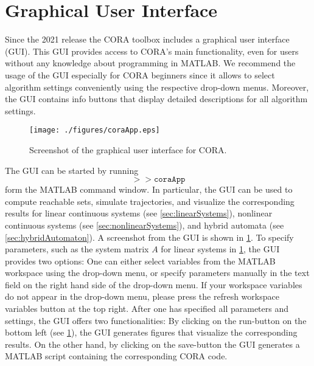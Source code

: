 \section{Graphical User Interface} \label{sec:gui}

Since the 2021 release the CORA toolbox includes a graphical user interface (GUI). This GUI provides access to CORA's main functionality, even for users without any knowledge about programming in MATLAB. We recommend the usage of the GUI especially for CORA beginners since it allows to select algorithm settings conveniently using the respective drop-down menus. Moreover, the GUI contains info buttons that display detailed descriptions for all algorithm settings.

\begin{figure}[htb]
    \centering
    \footnotesize
    \texttt{[image: ./figures/coraApp.eps]}
    \caption{Screenshot of the graphical user interface for CORA.}
    \label{fig:gui}
\end{figure}

The GUI can be started by running
\begin{equation*}
    >> \texttt{coraApp}
\end{equation*}
form the MATLAB command window.
In particular, the GUI can be used to compute reachable sets, simulate trajectories,
and visualize the corresponding results for linear continuous systems (see \cref{sec:linearSystems}),
nonlinear continuous systems (see \cref{sec:nonlinearSystems}), and hybrid automata (see \cref{sec:hybridAutomaton}).
A screenshot from the GUI is shown in \cref{fig:gui}.
To specify parameters, such as the system matrix $A$ for linear systems in \cref{fig:gui}, the GUI provides two options:
One can either select variables from the MATLAB workspace using the drop-down menu,
or specify parameters manually in the text field on the right hand side of the drop-down menu.
If your workspace variables do not appear in the drop-down menu,
please press the refresh workspace variables button at the top right.
After one has specified all parameters and settings, the GUI offers two functionalities:
By clicking on the run-button on the bottom left (see \cref{fig:gui}),
the GUI generates figures that visualize the corresponding results.
On the other hand, by clicking on the save-button the GUI generates a MATLAB script containing the corresponding CORA code.
